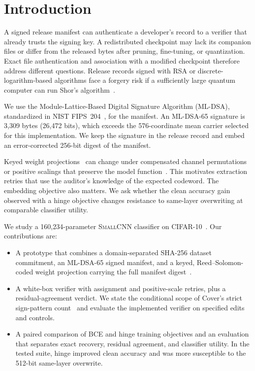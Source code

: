 \section{Introduction}
A signed release manifest can authenticate a developer's record to a verifier that already trusts the signing key. A redistributed checkpoint may lack its companion files or differ from the released bytes after pruning, fine-tuning, or quantization. Exact file authentication and association with a modified checkpoint therefore address different questions. Release records signed with RSA or discrete-logarithm-based algorithms face a forgery risk if a sufficiently large quantum computer can run Shor's algorithm~\cite{shor1994algorithms,campbell2026mbom}.

We use the Module-Lattice-Based Digital Signature Algorithm (ML-DSA), standardized in NIST FIPS~204~\cite{nist204}, for the manifest. An ML-DSA-65 signature is 3,309 bytes (26,472 bits), which exceeds the 576-coordinate mean carrier selected for this implementation. We keep the signature in the release record and embed an error-corrected 256-bit digest of the manifest.

Keyed weight projections~\cite{uchida2017embedding} can change under compensated channel permutations or positive scalings that preserve the model function~\cite{yan2023rethinking}. This motivates extraction retries that use the auditor's knowledge of the expected codeword. The embedding objective also matters. We ask whether the clean accuracy gain observed with a hinge objective changes resistance to same-layer overwriting at comparable classifier utility.

We study a 160,234-parameter \textsc{SmallCNN} classifier on CIFAR-10~\cite{cifar10}. Our contributions are:
\begin{itemize}
  \item A prototype that combines a domain-separated SHA-256 dataset commitment, an ML-DSA-65 signed manifest, and a keyed, Reed--Solomon-coded weight projection carrying the full manifest digest~\cite{projectResults}.
  \item A white-box verifier with assignment and positive-scale retries, plus a residual-agreement verdict. We state the conditional scope of Cover's strict sign-pattern count~\cite{cover1965geometrical} and evaluate the implemented verifier on specified edits and controls.
  \item A paired comparison of BCE and hinge training objectives and an evaluation that separates exact recovery, residual agreement, and classifier utility. In the tested suite, hinge improved clean accuracy and was more susceptible to the 512-bit same-layer overwrite.
\end{itemize}

